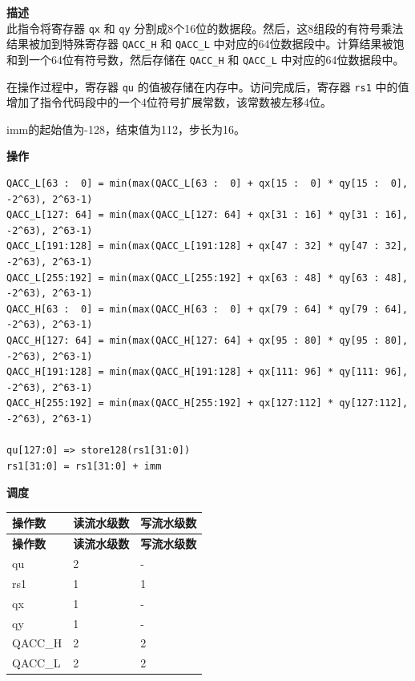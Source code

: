 \textbf{描述}\\
此指令将寄存器 \lstinline{qx} 和 \lstinline{qy} 分割成8个16位的数据段。然后，这8组段的有符号乘法结果被加到特殊寄存器 \lstinline{QACC_H} 和 \lstinline{QACC_L} 中对应的64位数据段中。计算结果被饱和到一个64位有符号数，然后存储在 \lstinline{QACC_H} 和 \lstinline{QACC_L} 中对应的64位数据段中。

在操作过程中，寄存器 \lstinline{qu} 的值被存储在内存中。访问完成后，寄存器 \lstinline{rs1} 中的值增加了指令代码段中的一个4位符号扩展常数，该常数被左移4位。

imm的起始值为-128，结束值为112，步长为16。

\textbf{操作}\\
\begin{lstlisting}
QACC_L[63 :  0] = min(max(QACC_L[63 :  0] + qx[15 :  0] * qy[15 :  0], -2^63), 2^63-1)
QACC_L[127: 64] = min(max(QACC_L[127: 64] + qx[31 : 16] * qy[31 : 16], -2^63), 2^63-1)
QACC_L[191:128] = min(max(QACC_L[191:128] + qx[47 : 32] * qy[47 : 32], -2^63), 2^63-1)
QACC_L[255:192] = min(max(QACC_L[255:192] + qx[63 : 48] * qy[63 : 48], -2^63), 2^63-1)
QACC_H[63 :  0] = min(max(QACC_H[63 :  0] + qx[79 : 64] * qy[79 : 64], -2^63), 2^63-1)
QACC_H[127: 64] = min(max(QACC_H[127: 64] + qx[95 : 80] * qy[95 : 80], -2^63), 2^63-1)
QACC_H[191:128] = min(max(QACC_H[191:128] + qx[111: 96] * qy[111: 96], -2^63), 2^63-1)
QACC_H[255:192] = min(max(QACC_H[255:192] + qx[127:112] * qy[127:112], -2^63), 2^63-1)

qu[127:0] => store128(rs1[31:0])
rs1[31:0] = rs1[31:0] + imm
\end{lstlisting}

\textbf{调度}\\
\begin{longtable}[c]{|l|l|l|}
    \hline
    \rowcolor{lightgray}
    \textbf{操作数} & \textbf{读流水级数} & \textbf{写流水级数} \\\hline
    \endfirsthead
    \hline
    \rowcolor{lightgray}
     \textbf{操作数} & \textbf{读流水级数} & \textbf{写流水级数} \\\hline
    \endhead
    \hline
    \endfoot

    qu & 2 & - \\\hline
    rs1 & 1 & 1 \\\hline

     qx & 1 & - \\\hline
     qy & 1 & - \\\hline
     QACC\_H & 2 & 2 \\\hline
     QACC\_L & 2 & 2

\end{longtable}

